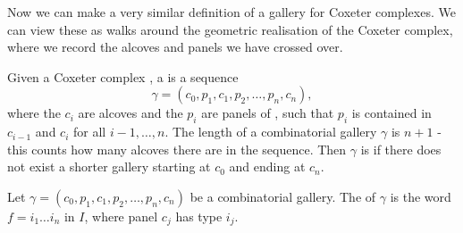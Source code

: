 \documentclass[11pt]{article}
\begin{document}







Now we can make a very similar definition of a gallery for Coxeter complexes. We can view these as walks around the geometric realisation of the Coxeter complex, where we record the alcoves and panels we have crossed over. 

\begin{definition}\label{comb.gallery}
    Given a Coxeter complex \sg, a  is a sequence
    \[\gamma = (c_0,p_1,c_1,p_2,\hdots  ,p_n,c_n),\]
    where the $c_i$ are alcoves and the $p_i$ are panels of \sg, such that $p_i$ is contained in $c_{i-1}$ and $c_{i}$ for all $i-1,\hdots ,n$. The length of a combinatorial gallery $\gamma$ is $n+1$ - this counts how many alcoves there are in the sequence. Then $\gamma$ is  if there does not exist a shorter gallery starting at $c_0$ and ending at $c_n$. 
\end{definition}

\begin{definition}\label{type}
    Let $\gamma=(c_0,p_1,c_1,p_2,\hdots  ,p_n,c_n)$ be a combinatorial gallery. The  of $\gamma$ is the word $f=i_1\hdots i_n$ in $I$, where panel $c_j$ has type $i_j$. 
\end{definition}
\end{document}
